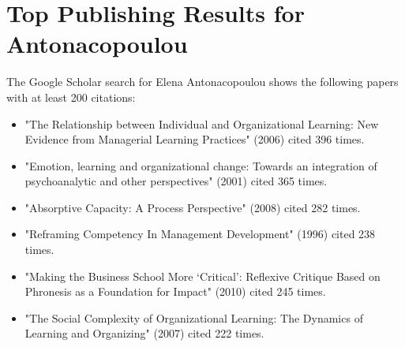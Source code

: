 
\section{Top Publishing Results for Antonacopoulou}

The Google Scholar search for Elena Antonacopoulou shows the following papers with at least 200 citations:\\

\begin{itemize}
\item "The Relationship between Individual and Organizational Learning: New Evidence from Managerial Learning Practices" (2006) cited 396 times.
\item "Emotion, learning and organizational change: Towards an integration of psychoanalytic and other perspectives" (2001) cited 365 times.
\item "Absorptive Capacity: A Process Perspective" (2008) cited 282 times.
\item "Reframing Competency In Management Development" (1996) cited 238 times.
\item "Making the Business School More ‘Critical’: Reflexive Critique Based on Phronesis as a Foundation for Impact" (2010) cited 245 times.
\item "The Social Complexity of Organizational Learning: The Dynamics of Learning and Organizing" (2007) cited 222 times.
\end{itemize}